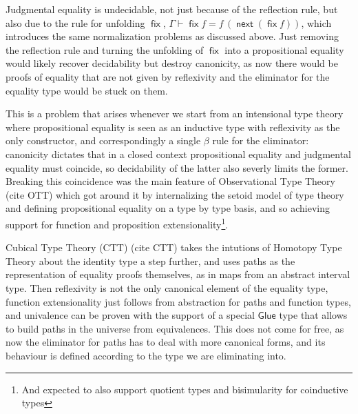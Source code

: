 \documentclass{book}
\DeclareMathOperator{\fix}{\mathsf{fix}}
\DeclareMathOperator{\next}{\ensuremath{\mathsf{next}}}
\begin{document}
  Judgmental equality is undecidable, not just because of the
  reflection rule, but also due to the rule for unfolding $\fix$,
  $\Gamma \vdash \fix f = f\,(\next (\fix f))$, which introduces the
  same normalization problems as discussed above. Just removing the
  reflection rule and turning the unfolding of $\fix$ into a
  propositional equality would likely recover decidability but destroy
  canonicity, as now there would be proofs of equality that are not
  given by reflexivity and the eliminator for the equality type would
  be stuck on them.

  This is a problem that arises whenever we start from an intensional
  type theory where propositional equality is seen as an inductive
  type with reflexivity as the only constructor, and correspondingly a
  single $\beta$ rule for the eliminator: canonicity dictates that in
  a closed context propositional equality and judgmental equality must
  coincide, so decidability of the latter also severly limits the
  former. Breaking this coincidence was the main feature of Observational Type Theory (cite OTT) which got around it by
  internalizing the setoid model of type theory and defining
  propositional equality on a type by type basis, and so achieving
  support for function and proposition extensionality\footnote{And expected to also support quotient types and bisimularity for coinductive types}.

  Cubical Type Theory (CTT) (cite CTT) takes the intutions of Homotopy
  Type Theory about the identity type a step further, and uses paths
  as the representation of equality proofs themselves, as in maps from
  an abstract interval type. Then reflexivity is not the only
  canonical element of the equality type, function extensionality just
  follows from abstraction for paths and function types, and
  univalence can be proven with the support of a special
  $\mathsf{Glue}$ type that allows to build paths in the universe from
  equivalences. This does not come for free, as now the eliminator for
  paths has to deal with more canonical forms, and its
  behaviour is defined according to the type we are eliminating into.
\end{document}
